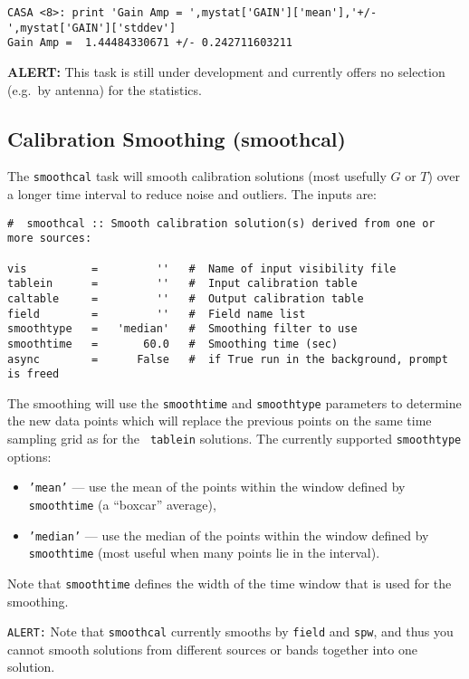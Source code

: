 {\begin{verbatim}
CASA <8>: print 'Gain Amp = ',mystat['GAIN']['mean'],'+/-',mystat['GAIN']['stddev']
Gain Amp =  1.44484330671 +/- 0.242711603211
\end{verbatim}
\normalsize

{\bf ALERT:} This task is still under development and currently offers no
selection (e.g.\ by antenna) for the statistics.

\subsection{Calibration Smoothing ({\rm smoothcal})}
\label{section:cal.tables.smooth}

The {\tt smoothcal} task will smooth calibration solutions 
(most usefully $G$ or $T$) over a longer time interval to reduce noise
and outliers.  The inputs are:
\small
\begin{verbatim}
#  smoothcal :: Smooth calibration solution(s) derived from one or more sources:

vis          =         ''   #  Name of input visibility file
tablein      =         ''   #  Input calibration table
caltable     =         ''   #  Output calibration table
field        =         ''   #  Field name list
smoothtype   =   'median'   #  Smoothing filter to use
smoothtime   =       60.0   #  Smoothing time (sec)
async        =      False   #  if True run in the background, prompt is freed
\end{verbatim}
\normalsize

The smoothing will use the {\tt smoothtime} and {\tt smoothtype}
parameters to determine the new data points which will replace the
previous points on the same time sampling grid as for the {\tt
tablein} solutions.  The currently supported {\tt smoothtype} 
options: 
\begin{itemize}
\item {\tt 'mean'} --- use the mean of the points within the window
defined by {\tt smoothtime} (a ``boxcar'' average),

\item {\tt 'median'} --- use the median of the points within the window
defined by {\tt smoothtime} (most useful when many points lie in the
interval).
\end{itemize}
Note that {\tt smoothtime} defines the width of the time window that
is used for the smoothing.

{\tt ALERT:} Note that {\tt smoothcal} currently smooths by
{\tt field} and {\tt spw}, and thus you cannot smooth solutions
from different sources or bands together into one solution.

}
